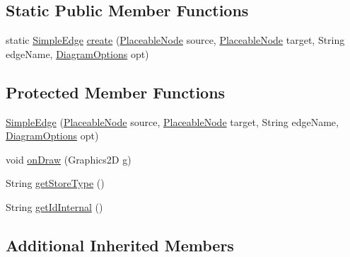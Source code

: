 \subsection*{Static Public Member Functions}
\begin{DoxyCompactItemize}
\item 
static \hyperlink{classorg_1_1tzi_1_1use_1_1gui_1_1views_1_1diagrams_1_1elements_1_1edges_1_1_simple_edge}{Simple\-Edge} \hyperlink{classorg_1_1tzi_1_1use_1_1gui_1_1views_1_1diagrams_1_1elements_1_1edges_1_1_simple_edge_ab5881db5c2a6a628d58d7355bf29076e}{create} (\hyperlink{classorg_1_1tzi_1_1use_1_1gui_1_1views_1_1diagrams_1_1elements_1_1_placeable_node}{Placeable\-Node} source, \hyperlink{classorg_1_1tzi_1_1use_1_1gui_1_1views_1_1diagrams_1_1elements_1_1_placeable_node}{Placeable\-Node} target, String edge\-Name, \hyperlink{classorg_1_1tzi_1_1use_1_1gui_1_1views_1_1diagrams_1_1_diagram_options}{Diagram\-Options} opt)
\end{DoxyCompactItemize}
\subsection*{Protected Member Functions}
\begin{DoxyCompactItemize}
\item 
\hyperlink{classorg_1_1tzi_1_1use_1_1gui_1_1views_1_1diagrams_1_1elements_1_1edges_1_1_simple_edge_a977f37759f0d4515688df40294933fb8}{Simple\-Edge} (\hyperlink{classorg_1_1tzi_1_1use_1_1gui_1_1views_1_1diagrams_1_1elements_1_1_placeable_node}{Placeable\-Node} source, \hyperlink{classorg_1_1tzi_1_1use_1_1gui_1_1views_1_1diagrams_1_1elements_1_1_placeable_node}{Placeable\-Node} target, String edge\-Name, \hyperlink{classorg_1_1tzi_1_1use_1_1gui_1_1views_1_1diagrams_1_1_diagram_options}{Diagram\-Options} opt)
\item 
void \hyperlink{classorg_1_1tzi_1_1use_1_1gui_1_1views_1_1diagrams_1_1elements_1_1edges_1_1_simple_edge_a898dab23f27c842090edf53bf92422c5}{on\-Draw} (Graphics2\-D g)
\item 
String \hyperlink{classorg_1_1tzi_1_1use_1_1gui_1_1views_1_1diagrams_1_1elements_1_1edges_1_1_simple_edge_ae79ce451364acae55eafe93cec1a7712}{get\-Store\-Type} ()
\item 
String \hyperlink{classorg_1_1tzi_1_1use_1_1gui_1_1views_1_1diagrams_1_1elements_1_1edges_1_1_simple_edge_ac2162341f6174bdd1701c5ba2d3ec577}{get\-Id\-Internal} ()
\end{DoxyCompactItemize}
\subsection*{Additional Inherited Members}


